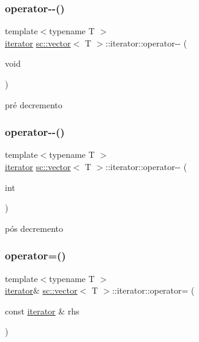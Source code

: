 \subsubsection{\texorpdfstring{operator-\/-\/()}{operator--()}\hspace{0.1cm}{\footnotesize\ttfamily [1/2]}}
{\footnotesize\ttfamily template$<$typename T $>$ \\
\hyperlink{classsc_1_1vector_1_1iterator}{iterator} \hyperlink{classsc_1_1vector}{sc\+::vector}$<$ T $>$\+::iterator\+::operator-\/-\/ (\begin{DoxyParamCaption}\item[{void}]{ }\end{DoxyParamCaption})\hspace{0.3cm}{\ttfamily [inline]}}



pré decremento 

\mbox{\label{classsc_1_1vector_1_1iterator_ab4a76691eb8ba0da9e014fa49f4cce4f}} 
\subsubsection{\texorpdfstring{operator-\/-\/()}{operator--()}\hspace{0.1cm}{\footnotesize\ttfamily [2/2]}}
{\footnotesize\ttfamily template$<$typename T $>$ \\
\hyperlink{classsc_1_1vector_1_1iterator}{iterator} \hyperlink{classsc_1_1vector}{sc\+::vector}$<$ T $>$\+::iterator\+::operator-\/-\/ (\begin{DoxyParamCaption}\item[{int}]{ }\end{DoxyParamCaption})\hspace{0.3cm}{\ttfamily [inline]}}



pós decremento 

\mbox{\label{classsc_1_1vector_1_1iterator_a744168c87e46c6e962c30eb3ee3299ab}} 
\subsubsection{\texorpdfstring{operator=()}{operator=()}}
{\footnotesize\ttfamily template$<$typename T $>$ \\
\hyperlink{classsc_1_1vector_1_1iterator}{iterator}\& \hyperlink{classsc_1_1vector}{sc\+::vector}$<$ T $>$\+::iterator\+::operator= (\begin{DoxyParamCaption}\item[{const \hyperlink{classsc_1_1vector_1_1iterator}{iterator} \&}]{rhs }\end{DoxyParamCaption})\hspace{0.3cm}{\ttfamily [inline]}}


